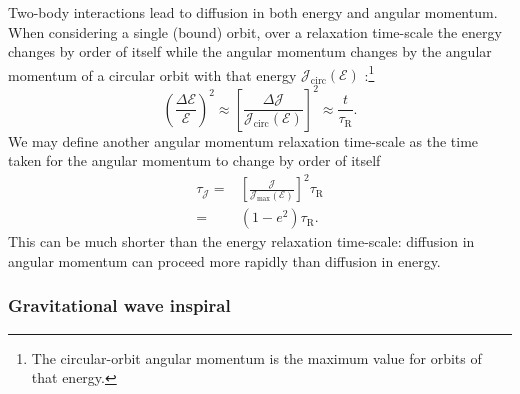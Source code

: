 \documentclass[useAMS,usedcolumn,usegraphicx,usenatbib]{mn2e}
\newcommand{\sub}[1]{\ensuremath{_\mathrm{#1}}}
\begin{document}
Two-body interactions lead to diffusion in both energy and angular momentum. When considering a single (bound) orbit, over a relaxation time-scale the energy changes by order of itself while the angular momentum changes by the angular momentum of a circular orbit with that energy $\mathcal{J}\sub{circ}(\mathcal{E})$ \citep{Lightman1977, Rauch1996, Hopman2005}:\footnote{The circular-orbit angular momentum is the maximum value for orbits of that energy.}
\begin{equation}
\left(\frac{\Delta\mathcal{E}}{\mathcal{E}}\right)^{2} \approx \left[\frac{\Delta \mathcal{J}}{\mathcal{J}\sub{circ}(\mathcal{E})}\right]^{2} \approx \frac{t}{\tau\sub{R}}.
\label{eq:diffuse-relax}
\end{equation}
We may define another angular momentum relaxation time-scale as the time taken for the angular momentum to change by order of itself \citep{Merritt2011}
\begin{align}
\tau_\mathcal{J} = {} & \left[\frac{\mathcal{J}}{\mathcal{J}\sub{max}(\mathcal{E})}\right]^2\tau\sub{R} \\
 = {} & \left(1 - e^2\right) \tau\sub{R}.
\label{eq:J-time}
\end{align}
This can be much shorter than the energy relaxation time-scale: diffusion in angular momentum can proceed more rapidly than diffusion in energy.

\subsubsection{Gravitational wave inspiral}\label{sec:GW-in}
\end{document}
